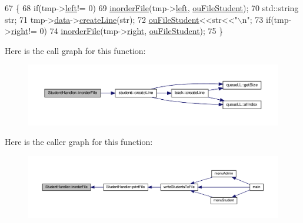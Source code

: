 \begin{DoxyCode}
67                                                                                      \{
68         \textcolor{keywordflow}{if}(tmp->\hyperlink{class_node_abb08a8b3137dd8fc8874348a439e01b4}{left}!= 0)
69             \hyperlink{class_student_handler_a61f541e2aa02759a3213a9bceecf125c}{inorderFile}(tmp->\hyperlink{class_node_abb08a8b3137dd8fc8874348a439e01b4}{left}, \hyperlink{_library_mananagement_system_8cpp_a2e073350989a922d101f00447e52dfc6}{ouFileStudent});
70         std::string str;
71         tmp->\hyperlink{class_node_a8b322cc3cc17b752eb77533493713ddd}{data}->\hyperlink{classstudent_a4bc363a59fc8b14d81e8e5e0d2326444}{createLine}(str);
72         \hyperlink{_library_mananagement_system_8cpp_a2e073350989a922d101f00447e52dfc6}{ouFileStudent}<<str<<\textcolor{stringliteral}{"\(\backslash\)n"};
73         \textcolor{keywordflow}{if}(tmp->\hyperlink{class_node_a34452c0684d3cb1590406ad201b43e65}{right}!= 0)
74             \hyperlink{class_student_handler_a61f541e2aa02759a3213a9bceecf125c}{inorderFile}(tmp->\hyperlink{class_node_a34452c0684d3cb1590406ad201b43e65}{right}, \hyperlink{_library_mananagement_system_8cpp_a2e073350989a922d101f00447e52dfc6}{ouFileStudent});
75     \}
\end{DoxyCode}
Here is the call graph for this function\+:
\nopagebreak
\begin{figure}[H]
\begin{center}
\leavevmode
\includegraphics[width=350pt]{class_student_handler_a61f541e2aa02759a3213a9bceecf125c_cgraph}
\end{center}
\end{figure}
Here is the caller graph for this function\+:
\nopagebreak
\begin{figure}[H]
\begin{center}
\leavevmode
\includegraphics[width=350pt]{class_student_handler_a61f541e2aa02759a3213a9bceecf125c_icgraph}
\end{center}
\end{figure}
\mbox{\label{class_student_handler_a08899a7b8ca38541605c564c572d72ef}} 

